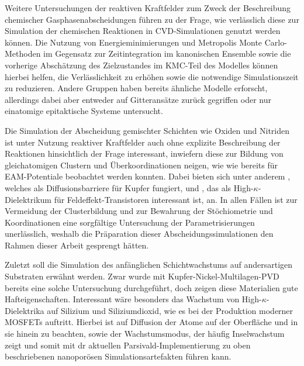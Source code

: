 Weitere Untersuchungen der reaktiven Kraftfelder zum Zweck der Beschreibung chemischer Gasphasenabscheidungen führen zu der Frage, wie verlässlich diese zur Simulation der chemischen Reaktionen in CVD-Simulationen genutzt werden können.
Die Nutzung von Energieminimierungen und Metropolis Monte Carlo-Methoden im Gegensatz zur Zeitintegration im kanonischen Ensemble sowie die vorherige Abschätzung des Zielzustandes im KMC-Teil des Modelles können hierbei helfen, die Verlässlichkeit zu erhöhen sowie die notwendige Simulationszeit zu reduzieren.
Andere Gruppen haben bereits ähnliche Modelle erforscht, allerdings dabei aber entweder auf Gitteransätze zurück gegriffen\cite{stamatakis_graph-theoretical_2011} oder nur einatomige epitaktische Systeme untersucht\cite{clark_hybrid_1996}.

Die Simulation der Abscheidung gemischter Schichten wie Oxiden und Nitriden ist unter Nutzung reaktiver Kraftfelder auch ohne explizite Beschreibung der Reaktionen hinsichtlich der Frage interessant, inwiefern diese zur Bildung von gleichatomigen Clustern und Überkoordinationen neigen, wie wie bereits für EAM-Potentiale beobachtet werden konnten\cite{lorenz_entwicklung_2012}.
Dabei bieten sich unter anderem , welches als Diffusionsbarriere für Kupfer fungiert, und , das als High-$\kappa$-Dielektrikum für Feldeffekt-Transistoren interessant ist, an.
In allen Fällen ist zur Vermeidung der Clusterbildung und zur Bewahrung der Stöchiometrie und Koordinationen eine sorgfältige Untersuchung der Parametrisierungen unerlässlich, weshalb die Präparation dieser Abscheidungssimulationen den Rahmen dieser Arbeit gesprengt hätten.

Zuletzt soll die Simulation des anfänglichen Schichtwachstums auf andersartigen Substraten erwähnt werden.
Zwar wurde mit Kupfer-Nickel-Multilagen-PVD bereits eine solche Untersuchung durchgeführt, doch zeigen diese Materialien gute Hafteigenschaften.
Interessant wäre besonders das Wachstum von High-$\kappa$-Dielektrika auf Silizium und Siliziumdioxid, wie es bei der Produktion moderner MOSFETs auftritt.
Hierbei ist auf Diffusion der Atome auf der Oberfläche und in sie hinein zu beachten, sowie der Wachstumsmodus, der häufig Inselwachstum zeigt und somit mit dr aktuellen Parsivald-Implementierung zu oben beschriebenen nanoporösen Simulationsartefakten führen kann.

\vspace{0.5em}

